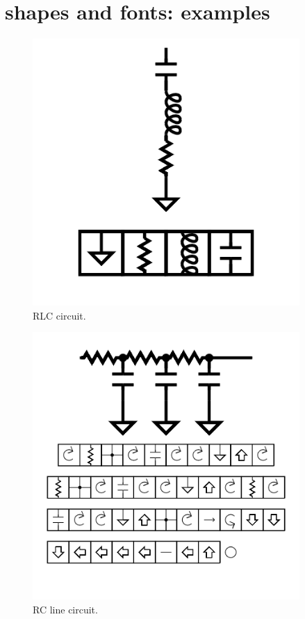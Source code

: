 \section{shapes and fonts: examples}

\begin{figure}
	\centering
	\includegraphics[width=4in]{figures/rlc.png}
	\caption[RLC]
	{RLC circuit.}
\end{figure}

\begin{figure}
	\centering
	\includegraphics[width=4in]{figures/rcline.png}
	\caption[RCline]
	{RC line circuit.}
\end{figure}


